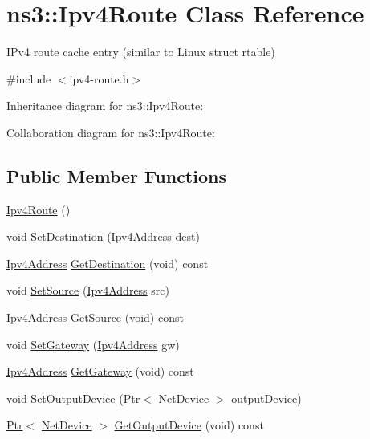 \hypertarget{classns3_1_1Ipv4Route}{}\section{ns3\+:\+:Ipv4\+Route Class Reference}
\label{classns3_1_1Ipv4Route}


I\+Pv4 route cache entry (similar to Linux struct rtable)  




{\ttfamily \#include $<$ipv4-\/route.\+h$>$}



Inheritance diagram for ns3\+:\+:Ipv4\+Route\+:


Collaboration diagram for ns3\+:\+:Ipv4\+Route\+:
\subsection*{Public Member Functions}
\begin{DoxyCompactItemize}
\item 
\hyperlink{classns3_1_1Ipv4Route_ad12d79265b8819070b06cdb2162eba41}{Ipv4\+Route} ()
\item 
void \hyperlink{classns3_1_1Ipv4Route_a5ba829530284bc4140180a3898bfcbc3}{Set\+Destination} (\hyperlink{classns3_1_1Ipv4Address}{Ipv4\+Address} dest)
\item 
\hyperlink{classns3_1_1Ipv4Address}{Ipv4\+Address} \hyperlink{classns3_1_1Ipv4Route_acf0399585635e9fea64f4a3616f6e7ea}{Get\+Destination} (void) const 
\item 
void \hyperlink{classns3_1_1Ipv4Route_a5e6a1491b4c1555044049f51d181f01f}{Set\+Source} (\hyperlink{classns3_1_1Ipv4Address}{Ipv4\+Address} src)
\item 
\hyperlink{classns3_1_1Ipv4Address}{Ipv4\+Address} \hyperlink{classns3_1_1Ipv4Route_af5898107b85ae3b1396543b370be7e8f}{Get\+Source} (void) const 
\item 
void \hyperlink{classns3_1_1Ipv4Route_a2845bf8024203ed54f105cc1efa2b7c3}{Set\+Gateway} (\hyperlink{classns3_1_1Ipv4Address}{Ipv4\+Address} gw)
\item 
\hyperlink{classns3_1_1Ipv4Address}{Ipv4\+Address} \hyperlink{classns3_1_1Ipv4Route_a9c4a795ba917976f64d62cd515a4b7a6}{Get\+Gateway} (void) const 
\item 
void \hyperlink{classns3_1_1Ipv4Route_a91c1b6d9a4aef72b547c7371dfd5d1d4}{Set\+Output\+Device} (\hyperlink{classns3_1_1Ptr}{Ptr}$<$ \hyperlink{classns3_1_1NetDevice}{Net\+Device} $>$ output\+Device)
\item 
\hyperlink{classns3_1_1Ptr}{Ptr}$<$ \hyperlink{classns3_1_1NetDevice}{Net\+Device} $>$ \hyperlink{classns3_1_1Ipv4Route_a3a23047af90d0ce9e01ee9809399fcc1}{Get\+Output\+Device} (void) const 
\end{DoxyCompactItemize}

